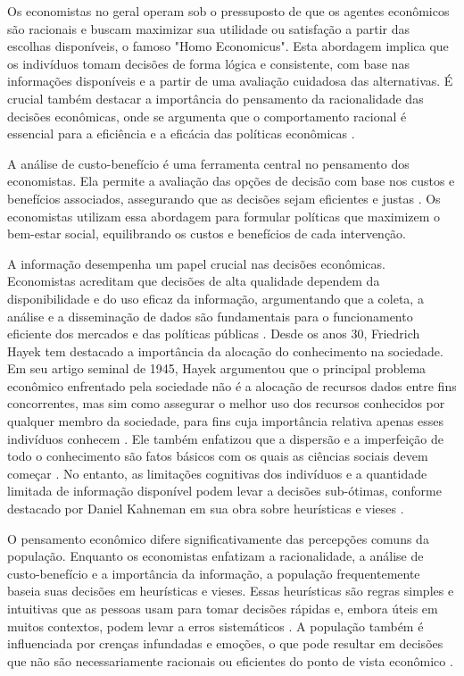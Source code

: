 Os economistas no geral operam sob o pressuposto de que os agentes econômicos são racionais e buscam maximizar sua utilidade ou satisfação a partir das escolhas disponíveis, o famoso "Homo Economicus". Esta abordagem implica que os indivíduos tomam decisões de forma lógica e consistente, com base nas informações disponíveis e a partir de uma avaliação cuidadosa das alternativas. É crucial também destacar a importância do pensamento da racionalidade das decisões econômicas, onde se argumenta que o comportamento racional é essencial para a eficiência e a eficácia das políticas econômicas \cite{Hausman_McPherson_Satz_2016}.

A análise de custo-benefício é uma ferramenta central no pensamento dos economistas. Ela permite a avaliação das opções de decisão com base nos custos e benefícios associados, assegurando que as decisões sejam eficientes e justas \cite{KenBinmore2008}. Os economistas utilizam essa abordagem para formular políticas que maximizem o bem-estar social, equilibrando os custos e benefícios de cada intervenção.


A informação desempenha um papel crucial nas decisões econômicas. Economistas acreditam que decisões de alta qualidade dependem da disponibilidade e do uso eficaz da informação, argumentando que a coleta, a análise e a disseminação de dados são fundamentais para o funcionamento eficiente dos mercados e das políticas públicas \cite{positive_economics_friedman}. Desde os anos 30, Friedrich Hayek tem destacado a importância da alocação do conhecimento na sociedade. Em seu artigo seminal de 1945, Hayek argumentou que o principal problema econômico enfrentado pela sociedade não é a alocação de recursos dados entre fins concorrentes, mas sim como assegurar o melhor uso dos recursos conhecidos por qualquer membro da sociedade, para fins cuja importância relativa apenas esses indivíduos conhecem \cite{hayek_knowledge_use}. Ele também enfatizou que a dispersão e a imperfeição de todo o conhecimento são fatos básicos com os quais as ciências sociais devem começar \cite{hayek_knowledge_dispersion}. No entanto, as limitações cognitivas dos indivíduos e a quantidade limitada de informação disponível podem levar a decisões sub-ótimas, conforme destacado por Daniel Kahneman em sua obra sobre heurísticas e vieses \cite{Judgment_under_Uncertainty}.

O pensamento econômico difere significativamente das percepções comuns da população. Enquanto os economistas enfatizam a racionalidade, a análise de custo-benefício e a importância da informação, a população frequentemente baseia suas decisões em heurísticas e vieses. Essas heurísticas são regras simples e intuitivas que as pessoas usam para tomar decisões rápidas e, embora úteis em muitos contextos, podem levar a erros sistemáticos \cite{Judgment_under_Uncertainty}. A população também é influenciada por crenças infundadas e emoções, o que pode resultar em decisões que não são necessariamente racionais ou eficientes do ponto de vista econômico \cite{thaler2016misbehaving}.

